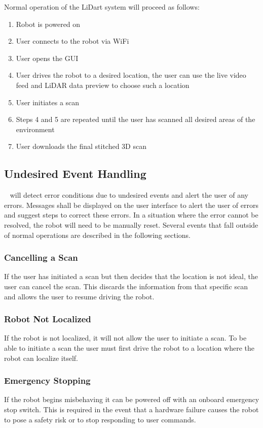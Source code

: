 \documentclass[12pt, titlepage]{article}
\begin{document}
\noindent Normal operation of the LiDart system will proceed as follows:
\begin{enumerate}
\item Robot is powered on
\item User connects to the robot via WiFi
\item User opens the GUI
\item User drives the robot to a desired location, the user can use the live video feed and LiDAR data preview to choose such a location
\item User initiates a scan
\item Steps 4 and 5 are repeated until the user has scanned all desired areas of the environment
\item User downloads the final stitched 3D scan    
\end{enumerate}

\subsection{Undesired Event Handling}


\progname~ will detect error conditions due to undesired events and alert the user of any errors. Messages shall be displayed on the user interface to alert the user of errors and suggest steps to correct these errors. In a situation where the error cannot be resolved, the robot will need to be manually reset. Several events that fall outside of normal operations are described in the following sections.

\subsubsection{\textbf{Cancelling a Scan}} If the user has initiated a scan but then decides that the location is not ideal, the user can cancel the scan. This discards the information from that specific scan and allows the user to resume driving the robot.

\subsubsection{\textbf{Robot Not Localized}} If the robot is not localized, it will not allow the user to initiate a scan. To be able to initiate a scan the user must first drive the robot to a location where the robot can localize itself.

\subsubsection{\textbf{Emergency Stopping}} If the robot begins misbehaving it can be powered off with an onboard emergency stop switch. This is required in the event that a hardware failure causes the robot to pose a safety risk or to stop responding to user commands.
\end{document}

